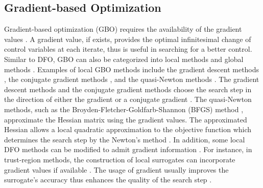 \subsection{Gradient-based Optimization}
\label{section: GBO}
Gradient-based optimization (GBO) requires the availability of the gradient values \cite{opt via sim review, nonlinear program}. 
A gradient value, if exists,
provides the optimal infinitesimal change of control variables at each iterate,
thus is useful in searching for a better control.
Similar to DFO, GBO can also be categorized into local methods and global methods \cite{opt via sim review}.
Examples of local GBO methods include the gradient descent methods 
\cite{stochastic search, backtrack line search}, the conjugate gradient 
methods \cite{linear conjugate gradient, nonlinear conjugate gradient}, and the quasi-Newton methods \cite{quasiNewton, LBFGS}. 
The gradient descent methods and
the conjugate gradient methods
choose the search step in the direction of either the gradient \cite{stochastic search, backtrack line search} or a conjugate gradient
\cite{linear conjugate gradient, nonlinear conjugate gradient}.
The quasi-Newton methods, such as the Broyden-Fletcher-Goldfarb-Shannon (BFGS) method
\cite{quasiNewton},
approximate the Hessian matrix using the gradient values. The approximated Hessian allows
a local quadratic approximation to the objective function which determines the search step 
by the Newton's method \cite{quasiNewton}. 
In addition, some local DFO methods can be modified to admit gradient information \cite{trust region global, trust region inexact grad}. 
For instance,
in trust-region methods, the construction of local surrogates can incorporate 
gradient values if available \cite{trust region global, trust region inexact grad}.
The usage of gradient usually improves the surrogate's accuracy thus enhances the quality
of the search step \cite{trust region global, trust region inexact grad}. \\

